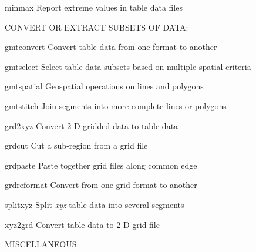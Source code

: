 \documentclass{article}
\begin{document}
\par 	minmax	Report extreme values in table data files\par 

\par \par 

\par CONVERT OR EXTRACT SUBSETS OF DATA:\par 

\par 	gmtconvert	Convert table data from one format to another\par 

\par 	gmtselect	Select table data subsets based on multiple spatial criteria\par 

\par 	gmtspatial	Geospatial operations on lines and polygons\par 

\par 	gmtstitch	Join segments into more complete lines or polygons\par 

\par 	grd2xyz	Convert 2-D gridded data to table data\par 

\par 	grdcut	Cut a sub-region from a grid file\par 

\par 	grdpaste	Paste together grid files along common edge\par 

\par 	grdreformat	Convert from one grid format to another\par 

\par 	splitxyz	Split \emph{xyz} table data into several segments\par 

\par 	xyz2grd	Convert table data to 2-D grid file\par 

\par \par 

\par MISCELLANEOUS:\par 
\end{document}
